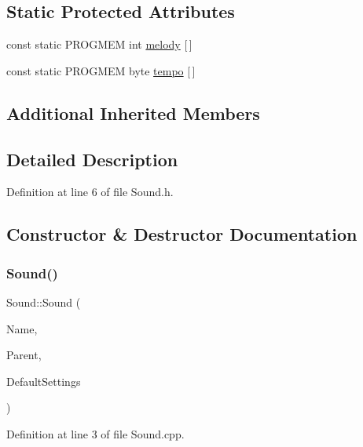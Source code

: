 \subsection*{Static Protected Attributes}
\begin{DoxyCompactItemize}
\item 
const static P\+R\+O\+G\+M\+EM int \hyperlink{class_sound_a7553aed616a29ed18c2e9f5b4a5f2260}{melody} \mbox{[}$\,$\mbox{]}
\item 
const static P\+R\+O\+G\+M\+EM byte \hyperlink{class_sound_ac0d9d464296a35fbe9624eb69c83f868}{tempo} \mbox{[}$\,$\mbox{]}
\end{DoxyCompactItemize}
\subsection*{Additional Inherited Members}


\subsection{Detailed Description}


Definition at line 6 of file Sound.\+h.



\subsection{Constructor \& Destructor Documentation}
\mbox{\label{class_sound_a9432356bb1ba946460c33f286d2b325b}} 
\subsubsection{\texorpdfstring{Sound()}{Sound()}\hspace{0.1cm}{\footnotesize\ttfamily [1/2]}}
{\footnotesize\ttfamily Sound\+::\+Sound (\begin{DoxyParamCaption}\item[{const \+\_\+\+\_\+\+Flash\+String\+Helper $\ast$}]{Name,  }\item[{\hyperlink{class_module}{Module} $\ast$}]{Parent,  }\item[{\hyperlink{struct_settings_1_1_sound_settings}{Settings\+::\+Sound\+Settings} $\ast$}]{Default\+Settings }\end{DoxyParamCaption})}



Definition at line 3 of file Sound.\+cpp.

